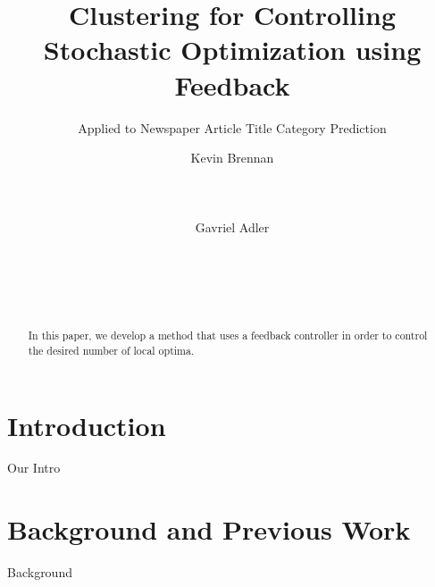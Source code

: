 \documentclass{sig-alternate}
\begin{document}
%

\title{Clustering for Controlling Stochastic Optimization using Feedback}
\subtitle{Applied to Newspaper Article Title Category Prediction}

\author{
\alignauthor
Kevin Brennan\\
       \\
       \\
       \\
\alignauthor
Gavriel Adler\\
       \\
       \\
       \\
       \\
}


\maketitle
\begin{abstract}
In this paper, we develop a method that uses a feedback controller in order to control the desired number
of local optima.
\end{abstract}




\section{Introduction}
Our Intro

\section{Background and Previous Work}
Background
\end{document}
